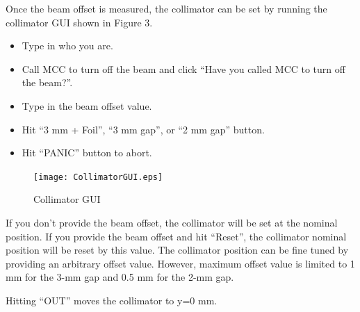 \documentclass[12pt]{report}
\begin{document}
Once the beam offset is measured, the collimator can be set by running the collimator GUI shown in Figure 3.

\begin{itemize}
\item
Type in who you are.
\item
Call MCC to turn off the beam and click ``Have you called MCC to turn off the beam?''.
\item
Type in the beam offset value.
\item
Hit ``3 mm + Foil'', ``3 mm gap'', or ``2 mm gap'' button.
\item
Hit ``PANIC'' button to abort.
\end{itemize}

\begin{figure}[ht!]
\centering
\texttt{[image: CollimatorGUI.eps]}
\caption{Collimator GUI}
\label{collimator}
\end{figure}

If you don't provide the beam offset, the collimator will be set at the nominal position. If you provide the beam offset and hit ``Reset'', the collimator nominal position will be reset by this value. The collimator position can be fine tuned by providing an arbitrary offset value. However, maximum offset value is limited to 1 mm for the 3-mm gap and 0.5 mm for the 2-mm gap.

Hitting ``OUT'' moves the collimator to y=0 mm.
 
\end{document}
